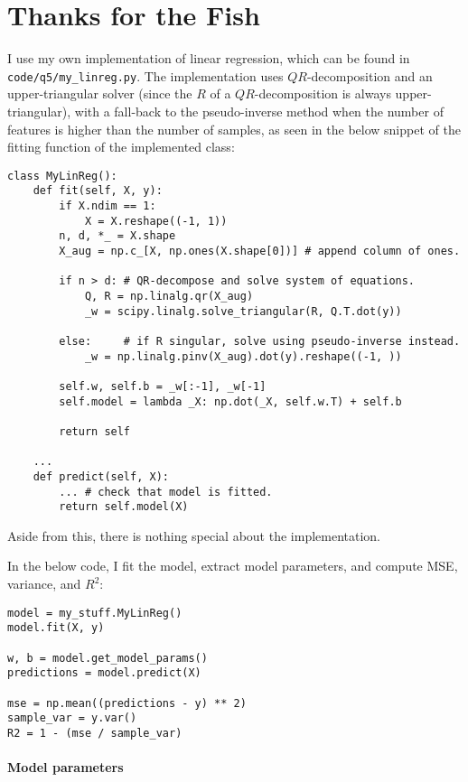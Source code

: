 \newpage
\section{Thanks for the Fish}

I use my own implementation of linear regression, which can be found in
\texttt{code/q5/my\_linreg.py}. The implementation uses $QR$-decomposition and
an upper-triangular solver (since the $R$ of a $QR$-decomposition is always
upper-triangular), with a fall-back to the pseudo-inverse method when the number
of features is higher than the number of samples, as seen in the below snippet
of the fitting function of the implemented class:

\begin{verbatim}
class MyLinReg():
    def fit(self, X, y):
        if X.ndim == 1:
            X = X.reshape((-1, 1))
        n, d, *_ = X.shape
        X_aug = np.c_[X, np.ones(X.shape[0])] # append column of ones.

        if n > d: # QR-decompose and solve system of equations.
            Q, R = np.linalg.qr(X_aug)
            _w = scipy.linalg.solve_triangular(R, Q.T.dot(y))

        else:     # if R singular, solve using pseudo-inverse instead.
            _w = np.linalg.pinv(X_aug).dot(y).reshape((-1, ))

        self.w, self.b = _w[:-1], _w[-1]
        self.model = lambda _X: np.dot(_X, self.w.T) + self.b

        return self

    ...
    def predict(self, X):
        ... # check that model is fitted.
        return self.model(X)
\end{verbatim}

Aside from this, there is nothing special about the implementation.

In the below code, I fit the model, extract model parameters, and compute MSE,
variance, and $R^2$:

\begin{verbatim}
model = my_stuff.MyLinReg()
model.fit(X, y)

w, b = model.get_model_params()
predictions = model.predict(X)

mse = np.mean((predictions - y) ** 2)
sample_var = y.var()
R2 = 1 - (mse / sample_var)
\end{verbatim}

\newpage
\paragraph{Model parameters}~

